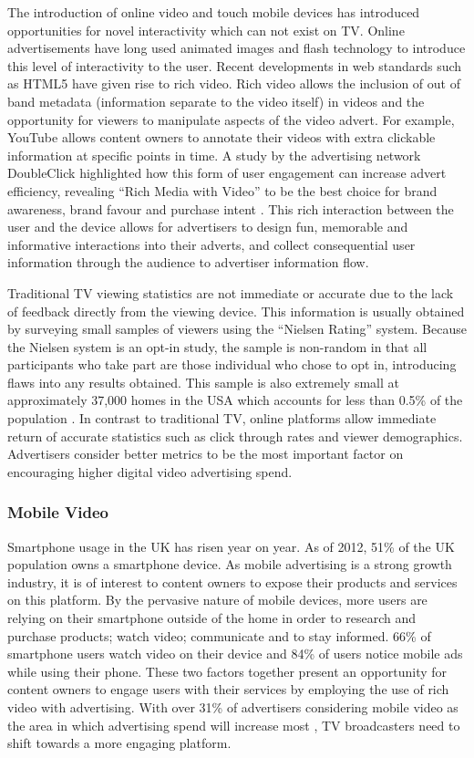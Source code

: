 	The introduction of online video and touch mobile devices has introduced opportunities for novel interactivity which can not exist on TV. Online advertisements have long used animated images and flash technology to introduce this level of interactivity to the user. Recent developments in web standards such as HTML5 have given rise to rich video. Rich video allows the inclusion of out of band metadata (information separate to the video itself) in videos and the opportunity for viewers to manipulate aspects of the video advert. For example, YouTube allows content owners to annotate their videos with extra clickable information at specific points in time. A study by the advertising network DoubleClick highlighted how this form of user engagement can increase advert efficiency, revealing ``Rich Media with Video'' to be the best choice for brand awareness, brand favour and purchase intent \citep{rich-video}. This rich interaction between the user and the device allows for advertisers to design fun, memorable and informative interactions into their adverts, and collect consequential user information through the audience to advertiser information flow.

	Traditional TV viewing statistics are not immediate or accurate due to the lack of feedback directly from the viewing device. This information is usually obtained by surveying small samples of viewers using the ``Nielsen Rating'' system. Because the Nielsen system is an opt-in study, the sample is non-random in that all participants who take part are those individual who chose to opt in, introducing flaws into any results obtained. This sample is also extremely small at approximately 37,000 homes in the USA which accounts for less than 0.5\% of the population \citep{nielsen-sample}. In contrast to traditional TV, online platforms allow immediate return of accurate statistics such as click through rates and viewer demographics. Advertisers consider better metrics to be the most important factor on encouraging higher digital video advertising spend.

\subsubsection{Mobile Video}

	Smartphone usage in the UK has risen year on year. As of 2012, 51\% of the UK population owns a smartphone device. As mobile advertising is a strong growth industry, it is of interest to content owners to expose their products and services on this platform. By the pervasive nature of mobile devices, more users are relying on their smartphone outside of the home in order to research and purchase products; watch video; communicate and to stay informed. 66\% of smartphone users watch video on their device and 84\% of users notice mobile ads while using their phone. \citep{mobile-planet} These two factors together present an opportunity for content owners to engage users with their services by employing the use of rich video with advertising. With over 31\% of advertisers considering mobile video as the area in which advertising spend will increase most \citep{brightroll-report}, TV broadcasters need to shift towards a more engaging platform.


